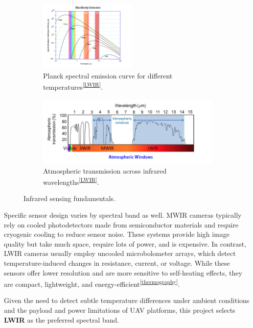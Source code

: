\begin{figure}[h!]
    \centering
    \begin{subfigure}[b]{0.48\linewidth}
        \centering
        \includegraphics[height=3.5cm]{figs/Huirui/wien_law_plot.png}
        \caption{Planck spectral emission curve for different temperatures\textsuperscript{\ref{LWIR}}.}
        \label{fig:wien_law}
    \end{subfigure}
    \hfill
    \begin{subfigure}[b]{0.48\linewidth}
        \centering
        \includegraphics[height=3.5cm]{figs/Huirui/atmospheric_window_plot.png}
        \caption{Atmospheric transmission across infrared wavelengths\textsuperscript{\ref{LWIR}}.}
        \label{fig:atmos_window}
    \end{subfigure}
    \caption{Infrared sensing fundamentals.}
\end{figure}


Specific sensor design varies by spectral band as well. \gls{MWIR} cameras typically rely on cooled photodetectors made from semiconductor materials and require cryogenic cooling to reduce sensor noise. These systems provide high image quality but take much space, require lots of power, and is expensive. In contrast, \gls{LWIR} cameras usually employ uncooled microbolometer arrays, which detect temperature-induced changes in resistance, current, or voltage. While these sensors offer lower resolution and are more sensitive to self-heating effects, they are compact, lightweight, and energy-efficient\textsuperscript{\ref{thermography}}.

Given the need to detect subtle temperature differences under ambient conditions and the payload and power limitations of \gls{UAV} platforms, this project selects \textbf{\gls{LWIR}} as the preferred spectral band.


